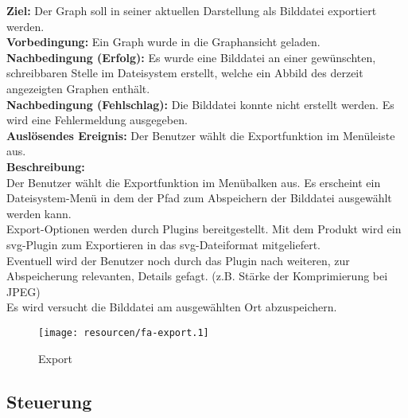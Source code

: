 \label{fa:export_img}
\textbf{Ziel:} Der Graph soll in seiner aktuellen Darstellung als Bilddatei exportiert werden.\\
\textbf{Vorbedingung:} Ein Graph wurde in die Graphansicht geladen. \\
\textbf{Nachbedingung (Erfolg):} Es wurde eine Bilddatei an einer gewünschten, schreibbaren Stelle im Dateisystem erstellt, welche ein Abbild des derzeit angezeigten Graphen enthält.\\
\textbf{Nachbedingung (Fehlschlag):} Die Bilddatei konnte nicht erstellt werden. Es wird eine Fehlermeldung ausgegeben.\\
\textbf{Auslösendes Ereignis:}
Der Benutzer wählt die Exportfunktion im Menüleiste aus.\\
\textbf{Beschreibung:}\\
Der Benutzer wählt die Exportfunktion im Menübalken aus.
Es erscheint ein Dateisystem-Menü in dem der Pfad zum Abspeichern der Bilddatei ausgewählt werden kann.\\
Export-Optionen werden durch Plugins bereitgestellt.
Mit dem Produkt wird ein \gls{svg}-Plugin zum Exportieren in das \gls{svg}-Dateiformat mitgeliefert.\\
Eventuell wird der Benutzer noch durch das Plugin nach weiteren, zur Abspeicherung relevanten, Details gefagt. (z.B. Stärke der Komprimierung bei JPEG)\\ %
Es wird versucht die Bilddatei am ausgewählten Ort abzuspeichern.\\

\begin{figure}[ht]
  \centering
  \texttt{[image: resourcen/fa-export.1]}
  \caption{Export}
  \label{fig:export}
\end{figure}

\subsection{Steuerung}
\setcounter{fanr}{200}

